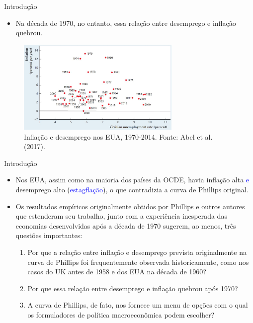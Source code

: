 \documentclass[10pt]{beamer}
\begin{document}
\begin{frame}{Introdução}
    \begin{itemize}
        \item Na década de 1970, no entanto, essa relação entre desemprego e inflação quebrou.
    \end{itemize}
    \begin{figure}
        \centering
        \includegraphics[width=0.7\textwidth]{./figures/aula13_fig7.JPG}
        \caption{Inflação e desemprego nos EUA, 1970-2014. Fonte: Abel et al. (2017).}
        \label{fig6}
    \end{figure}
\end{frame}

\begin{frame}{Introdução}
    \begin{itemize}
        \item Nos EUA, assim como na maioria dos países da OCDE, havia inflação alta \textcolor{blue}{e} desemprego alto (\textcolor{blue}{estagflação}), o que contradizia a curva de Phillips original.
        \bigskip
        \item Os resultados empíricos originalmente obtidos por Phillips e outros autores que estenderam seu trabalho, junto com a experiência inesperada das economias desenvolvidas após a década de 1970 sugerem, ao menos, três questões importantes:
        \bigskip
        \begin{enumerate}
            \item Por que a relação entre inflação e desemprego prevista originalmente na curva de Phillips foi frequentemente observada historicamente, como nos casos do UK antes de 1958 e dos EUA na década de 1960?
            \bigskip
            \item Por que essa relação entre desemprego e inflação quebrou após 1970?
            \bigskip
            \item A curva de Phillips, de fato, nos fornece um menu de opções com o qual os formuladores de política macroeconômica podem escolher?
        \end{enumerate}
    \end{itemize}
\end{frame}
\end{document}
